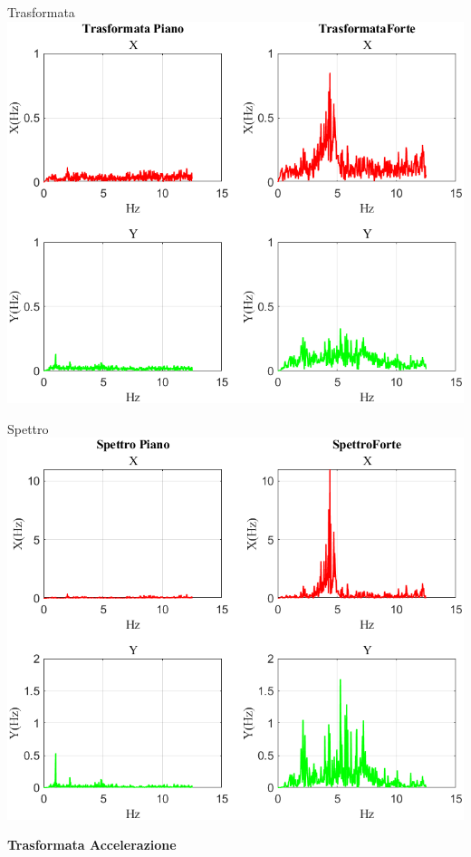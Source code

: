 \documentclass[beamer]{standalone}
\begin{document}
	\begin{frame}{{Trasformata}}
		\centering\includegraphics[height=.8\textheight]{figure/Acc/Trasformata/Trasformata}
	\end{frame}

	\begin{frame}{{Spettro}}
		\centering\includegraphics[height=.8\textheight]{figure/Acc/Trasformata/Spettro}
	\end{frame}
	
	\begin{frame}
		\color{blue}\centering\huge{\textbf{Trasformata Accelerazione}}
	\end{frame}
	
\end{document}

